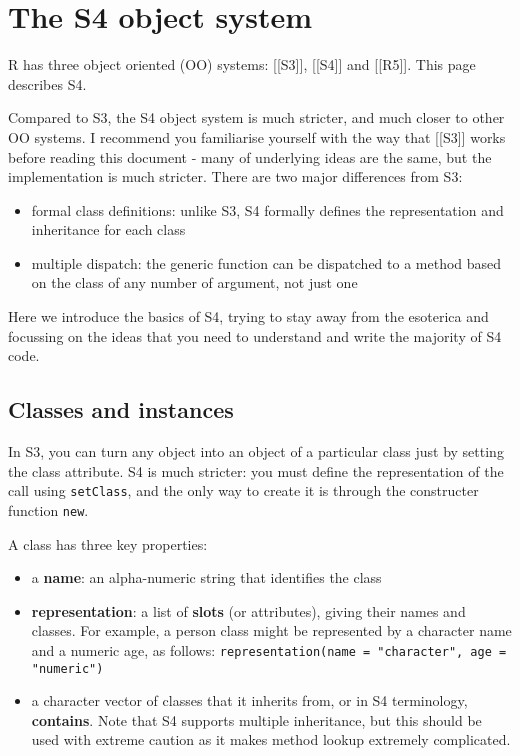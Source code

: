 \chapter{The S4 object system}

R has three object oriented (OO) systems: {[}{[}S3{]}{]}, {[}{[}S4{]}{]}
and {[}{[}R5{]}{]}. This page describes S4.

Compared to S3, the S4 object system is much stricter, and much closer
to other OO systems. I recommend you familiarise yourself with the way
that {[}{[}S3{]}{]} works before reading this document - many of
underlying ideas are the same, but the implementation is much stricter.
There are two major differences from S3:

\begin{itemize}
\item
  formal class definitions: unlike S3, S4 formally defines the
  representation and inheritance for each class
\item
  multiple dispatch: the generic function can be dispatched to a method
  based on the class of any number of argument, not just one
\end{itemize}

Here we introduce the basics of S4, trying to stay away from the
esoterica and focussing on the ideas that you need to understand and
write the majority of S4 code.

\section{Classes and instances}

In S3, you can turn any object into an object of a particular class just
by setting the class attribute. S4 is much stricter: you must define the
representation of the call using \texttt{setClass}, and the only way to
create it is through the constructer function \texttt{new}.

A class has three key properties:

\begin{itemize}
\item
  a \textbf{name}: an alpha-numeric string that identifies the class
\item
  \textbf{representation}: a list of \textbf{slots} (or attributes),
  giving their names and classes. For example, a person class might be
  represented by a character name and a numeric age, as follows:
  \texttt{representation(name = "character", age = "numeric")}
\item
  a character vector of classes that it inherits from, or in S4
  terminology, \textbf{contains}. Note that S4 supports multiple
  inheritance, but this should be used with extreme caution as it makes
  method lookup extremely complicated.
\end{itemize}

